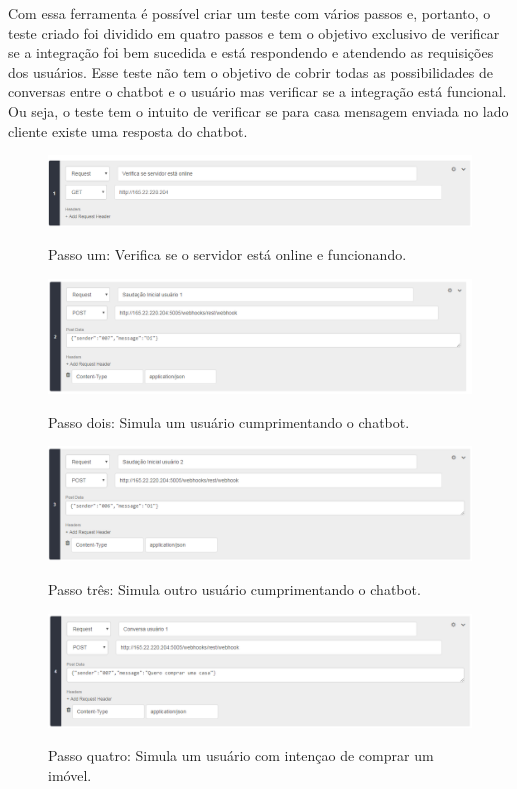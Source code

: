 Com essa ferramenta é possível criar um teste com vários passos e, portanto, o teste criado foi dividido em quatro passos e tem o objetivo exclusivo de  verificar se a integração foi bem sucedida e está respondendo e atendendo as requisições dos usuários. Esse teste não tem o objetivo de cobrir todas as possibilidades de conversas entre o chatbot e o usuário mas verificar se a integração está funcional. Ou seja, o teste tem o intuito de verificar se para casa mensagem enviada no lado cliente existe uma resposta do chatbot.


\begin{figure}[H]
  \centering
   \caption{Passo um: Verifica se o servidor está online e funcionando.}
  \includegraphics[scale=0.5]{Imagens/passo1.PNG} 
  \label{teste1}
\end{figure}

\begin{figure}[H]
  \centering
   \caption{Passo dois: Simula um usuário cumprimentando o chatbot.}
  \includegraphics[scale=0.5]{Imagens/passo2.PNG} 
  \label{teste2}
\end{figure}

\begin{figure}[H]
  \centering
   \caption{Passo três: Simula outro usuário cumprimentando o chatbot.}
  \includegraphics[scale=0.5]{Imagens/passo3.PNG} 
  \label{teste3}
\end{figure}

\begin{figure}[H]
  \centering
   \caption{Passo quatro: Simula um usuário com intençao de comprar um imóvel.}
  \includegraphics[scale=0.5]{Imagens/passo4.PNG} 
  \label{teste4}
\end{figure}


